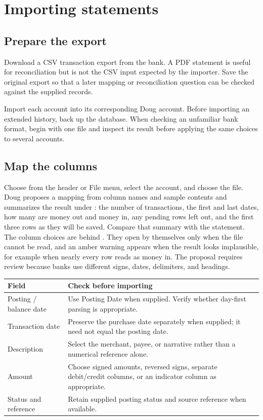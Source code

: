 \chapter{Importing statements}\label{ch:importing}
\section{Prepare the export}
Download a CSV transaction export from the bank. A PDF statement is useful for reconciliation but is not the CSV input expected by the importer. Save the original export so that a later mapping or reconciliation question can be checked against the supplied records.

Import each account into its corresponding Doug account. Before importing an extended history, back up the database. When checking an unfamiliar bank format, begin with one file and inspect its result before applying the same choices to several accounts.

\section{Map the columns}
Choose  from the header or File menu, select the account, and choose the file. Doug proposes a mapping from column names and sample contents and summarizes the result under : the number of transactions, the first and last dates, how many are money out and money in, any pending rows left out, and the first three rows as they will be saved. Compare that summary with the statement. The column choices are behind . They open by themselves only when the file cannot be read, and an amber warning appears when the result looks implausible, for example when nearly every row reads as money in. The proposal requires review because banks use different signs, dates, delimiters, and headings.

\begin{tabularx}{\textwidth}{@{}p{}Y@{}}
\toprule Field & Check before importing\\\midrule
Posting / balance date & Use Posting Date when supplied. Verify whether day-first parsing is appropriate.\\
Transaction date & Preserve the purchase date separately when supplied; it need not equal the posting date.\\
Description & Select the merchant, payee, or narrative rather than a numerical reference alone.\\
Amount & Choose signed amounts, reversed signs, separate debit/credit columns, or an indicator column as appropriate.\\
Status and reference & Retain supplied posting status and source reference when available.\\
\bottomrule
\end{tabularx}

